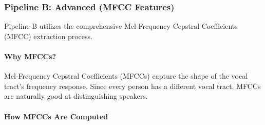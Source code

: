 \subsubsection*{Pipeline B: Advanced (MFCC Features)}

Pipeline B utilizes the comprehensive Mel-Frequency Cepstral Coefficients (MFCC) extraction process. 

\paragraph{Why MFCCs?}
Mel-Frequency Cepstral Coefficients (MFCCs) capture the shape of the vocal tract's frequency response. Since every person has a different vocal tract, MFCCs are naturally good at distinguishing speakers.

\paragraph{How MFCCs Are Computed}
